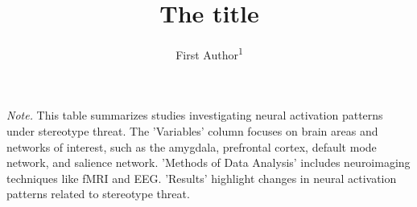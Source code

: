 \documentclass[
  stu, a4paper]{apa7}
\title{The title}
\author{First Author\textsuperscript{1}}
\date{}
\affiliation{\vspace{0.5cm}\textsuperscript{1} Wilhelm-Wundt-University}
\newenvironment{lltable}{\begin{landscape}\centering\begin{ThreePartTable}}{\end{ThreePartTable}\end{landscape}}
\begin{document}
\maketitle

\begin{lltable}

\begin{TableNotes}[para]
\normalsize{\textit{Note.} This table summarizes studies investigating neural activation patterns under stereotype threat. The 'Variables' column focuses on brain areas and networks of interest, such as the amygdala, prefrontal cortex, default mode network, and salience network. 'Methods of Data Analysis' includes neuroimaging techniques like fMRI and EEG. 'Results' highlight changes in neural activation patterns related to stereotype threat.}
\end{TableNotes}


\end{lltable}
\end{document}
